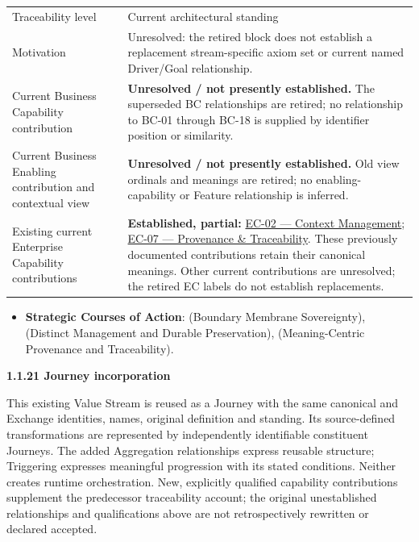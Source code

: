 \begin{longtable}{>{\raggedright\arraybackslash}p{}>{\raggedright\arraybackslash}p{}}
Traceability level & Current architectural standing \\
Motivation & Unresolved: the retired block does not establish a replacement stream-specific axiom set or current named Driver/Goal relationship. \\
Current Business Capability contribution & \textbf{Unresolved / not presently established.} The superseded BC relationships are retired; no relationship to BC-01 through BC-18 is supplied by identifier position or similarity. \\
Current Business Enabling contribution and contextual view & \textbf{Unresolved / not presently established.} Old view ordinals and meanings are retired; no enabling-capability or Feature relationship is inferred. \\
Existing current Enterprise Capability contributions & \textbf{Established, partial:} \href{\detokenize{../../../../../../../../docs/markdown/02-strategy/capabilities/enterprise-capabilities.md#ec-02-context-management}}{EC-02 — Context Management}; \href{\detokenize{../../../../../../../../docs/markdown/02-strategy/capabilities/enterprise-capabilities.md#ec-07-provenance--traceability}}{EC-07 — Provenance \& Traceability}. These previously documented contributions retain their canonical meanings. Other current contributions are unresolved; the retired EC labels do not establish replacements. \\
\end{longtable}


\begin{itemize}


\item \textbf{Strategic Courses of Action}: \texttt{} (Boundary Membrane Sovereignty), \texttt{} (Distinct Management and Durable Preservation), \texttt{} (Meaning-Centric Provenance and Traceability).

\end{itemize}


\par\medskip\textbf{1.1.21 Journey incorporation}\par


This existing Value Stream is reused as a Journey with the same canonical and Exchange identities, names, original definition and standing. Its source-defined transformations are represented by independently identifiable constituent Journeys. The added Aggregation relationships express reusable structure; Triggering expresses meaningful progression with its stated conditions. Neither creates runtime orchestration. New, explicitly qualified capability contributions supplement the predecessor traceability account; the original unestablished relationships and qualifications above are not retrospectively rewritten or declared accepted.


